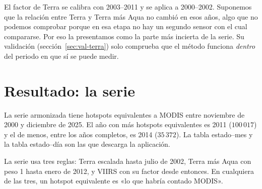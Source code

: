 \begin{cuidado}
El factor de Terra se calibra con 2003--2011 y se aplica a 2000--2002. Suponemos que la relación entre Terra y Terra más Aqua no cambió en esos años, algo que no podemos comprobar porque en esa etapa no hay un segundo sensor con el cual compararse. Por eso la presentamos como la parte más incierta de la serie. Su validación (sección~\ref{sec:val-terra}) solo comprueba que el método funciona \emph{dentro} del periodo en que sí se puede medir.
\end{cuidado}

\section{Resultado: la serie}

La serie armonizada tiene \totalArm{} hotspots equivalentes a MODIS entre noviembre de 2000 y diciembre de 2025. El año con más hotspots equivalentes es 2011 ($100\,017$) y el de menos, entre los años completos, es 2014 ($35\,372$). La tabla estado--mes y la tabla estado--día son las que descarga la aplicación.

\begin{ideaclave}
La serie usa tres reglas: Terra escalada hasta julio de 2002, Terra más Aqua con peso 1 hasta enero de 2012, y VIIRS con su factor desde entonces. En cualquiera de las tres, un hotspot equivalente es «lo que habría contado MODIS».
\end{ideaclave}
